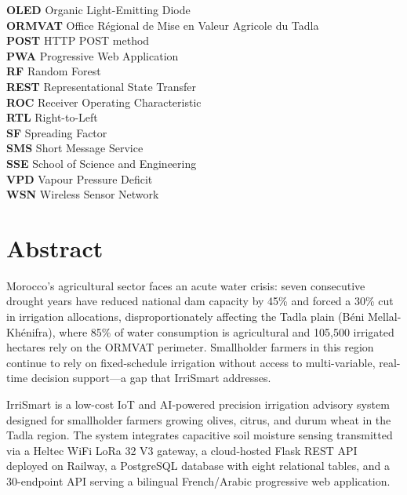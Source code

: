 \documentclass[12pt,a4paper]{report}
\begin{document}
\begin{tabbing}
  \textbf{OLED}  \> Organic Light-Emitting Diode \\
  \textbf{ORMVAT}\> Office Régional de Mise en Valeur Agricole du Tadla \\
  \textbf{POST}  \> HTTP POST method \\
  \textbf{PWA}   \> Progressive Web Application \\
  \textbf{RF}    \> Random Forest \\
  \textbf{REST}  \> Representational State Transfer \\
  \textbf{ROC}   \> Receiver Operating Characteristic \\
  \textbf{RTL}   \> Right-to-Left \\
  \textbf{SF}    \> Spreading Factor \\
  \textbf{SMS}   \> Short Message Service \\
  \textbf{SSE}   \> School of Science and Engineering \\
  \textbf{VPD}   \> Vapour Pressure Deficit \\
  \textbf{WSN}   \> Wireless Sensor Network \\
\end{tabbing}

\chapter*{Abstract}
\thispagestyle{fancy}

Morocco's agricultural sector faces an acute water crisis: seven consecutive drought years have reduced national dam capacity by 45\% and forced a 30\% cut in irrigation allocations, disproportionately affecting the Tadla plain (Béni Mellal-Khénifra), where 85\% of water consumption is agricultural and 105,500 irrigated hectares rely on the ORMVAT perimeter. Smallholder farmers in this region continue to rely on fixed-schedule irrigation without access to multi-variable, real-time decision support---a gap that IrriSmart addresses.

IrriSmart is a low-cost IoT and AI-powered precision irrigation advisory system designed for smallholder farmers growing olives, citrus, and durum wheat in the Tadla region. The system integrates capacitive soil moisture sensing transmitted via a Heltec WiFi LoRa 32 V3 gateway, a cloud-hosted Flask REST API deployed on Railway, a PostgreSQL database with eight relational tables, and a 30-endpoint API serving a bilingual French/Arabic progressive web application.
\end{document}
